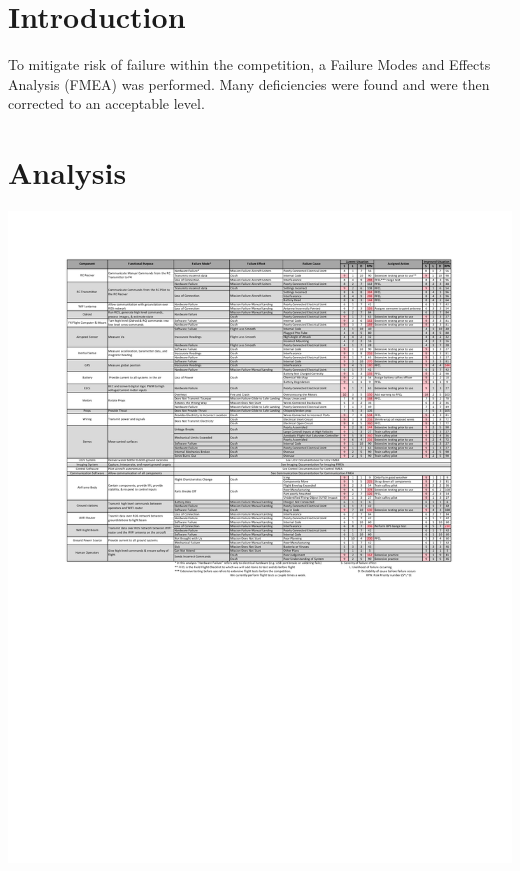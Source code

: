 \documentclass[]{auvsi_doc}
\begin{document}
\begin{AUVSITitlePage}
\begin{artifacttable}
\end{artifacttable}
\end{AUVSITitlePage}
\vspace*{-2cm}
\section{Introduction}
\vspace*{-0.5cm}
To mitigate risk of failure within the competition, a Failure Modes and Effects Analysis (FMEA) was performed. Many deficiencies were found and were then corrected to an acceptable level.
\vspace*{-0.5cm}
\section{Analysis}
\vspace*{-0.5cm}
\hspace*{-1.25cm}
\includegraphics[width=1.2\textwidth]{./figs/FMEA.pdf}
\label{fig:reqMat}
\end{document}
